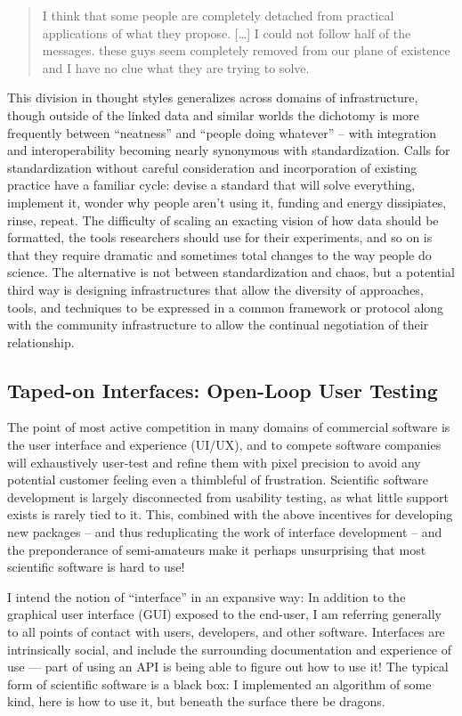 \documentclass[notoc]{tufte-book}
\begin{document}
\begin{quote}
I think that some people are completely detached from practical
applications of what they propose. {[}\ldots{]} I could not follow half
of the messages. these guys seem completely removed from our plane of
existence and I have no clue what they are trying to solve.
\end{quote}

This division in thought styles generalizes across domains of
infrastructure, though outside of the linked data and similar worlds the
dichotomy is more frequently between ``neatness'' and ``people doing
whatever'' -- with integration and interoperability becoming nearly
synonymous with standardization. Calls for standardization without
careful consideration and incorporation of existing practice have a
familiar cycle: devise a standard that will solve everything, implement
it, wonder why people aren't using it, funding and energy dissipiates,
rinse, repeat. The difficulty of scaling an exacting vision of how data
should be formatted, the tools researchers should use for their
experiments, and so on is that they require dramatic and sometimes total
changes to the way people do science. The alternative is not between
standardization and chaos, but a potential third way is designing
infrastructures that allow the diversity of approaches, tools, and
techniques to be expressed in a common framework or protocol along with
the community infrastructure to allow the continual negotiation of their
relationship.


\subsection{Taped-on Interfaces: Open-Loop User
Testing}

The point of most active competition in many domains of commercial
software is the user interface and experience (UI/UX), and to compete
software companies will exhaustively user-test and refine them with
pixel precision to avoid any potential customer feeling even a
thimbleful of frustration. Scientific software development is largely
disconnected from usability testing, as what little support exists is
rarely tied to it. This, combined with the above incentives for
developing new packages -- and thus reduplicating the work of interface
development -- and the preponderance of semi-amateurs make it perhaps
unsurprising that most scientific software is hard to use!

I intend the notion of ``interface'' in an expansive way: In addition to
the graphical user interface (GUI) exposed to the end-user, I am
referring generally to all points of contact with users, developers, and
other software. Interfaces are intrinsically social, and include the
surrounding documentation and experience of use --- part of using an API
is being able to figure out how to use it! The typical form of
scientific software is a black box: I implemented an algorithm of some
kind, here is how to use it, but beneath the surface there be dragons.
\end{document}
